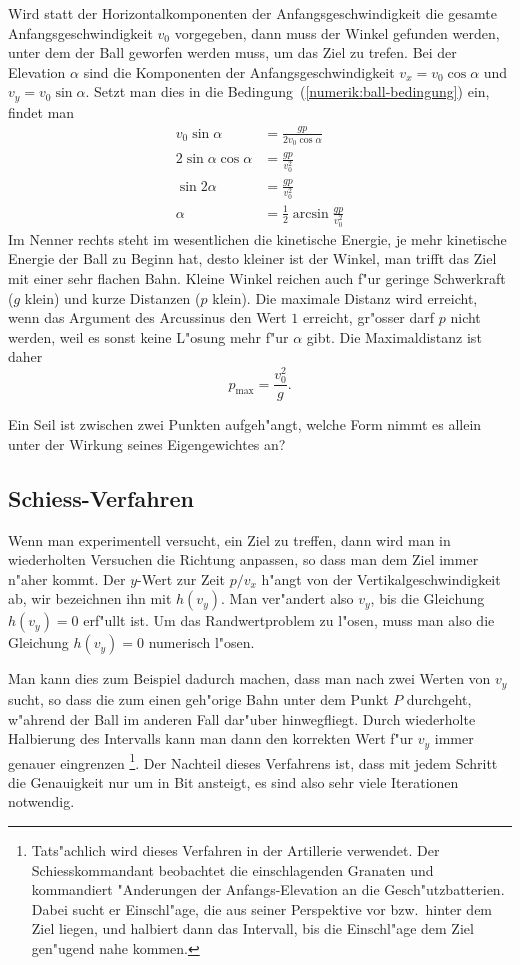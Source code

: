 Wird statt der Horizontalkomponenten der Anfangsgeschwindigkeit die
gesamte Anfangsgeschwindigkeit $v_0$ vorgegeben, dann muss der
Winkel gefunden werden, unter dem der Ball geworfen werden muss,
um das Ziel zu trefen.
Bei der Elevation $\alpha$ sind die Komponenten der Anfangsgeschwindigkeit
$v_x=v_0\cos\alpha$ und $v_y=v_0\sin\alpha$. 
Setzt man dies in die Bedingung~(\ref{numerik:ball-bedingung}) ein,
findet man
\begin{align*}
v_0 \sin \alpha &=\frac{gp}{2v_0\cos\alpha}
\\
2\sin\alpha\cos\alpha&=\frac{gp}{v_0^2}
\\
\sin2\alpha&=\frac{gp}{v_0^2}
\\
\alpha&= \frac12 \arcsin\frac{gp}{v_0^2}
\end{align*}
Im Nenner rechts steht im wesentlichen die kinetische Energie,
je mehr kinetische Energie der Ball zu Beginn hat, desto kleiner
ist der Winkel, man trifft das Ziel mit einer sehr flachen Bahn.
Kleine Winkel reichen auch f"ur geringe Schwerkraft ($g$ klein)
und kurze Distanzen ($p$ klein).
Die maximale Distanz wird erreicht, wenn das Argument des Arcussinus
den Wert $1$ erreicht, gr"osser darf $p$ nicht werden, weil es sonst
keine L"osung mehr f"ur $\alpha$ gibt.
Die Maximaldistanz ist daher
\[
p_{\text{max}} = \frac{v_0^2}{g}.
\]

\begin{aufgabe}
\label{numerik:aufgabe-seil}
Ein Seil ist zwischen zwei Punkten aufgeh"angt, welche Form nimmt es
allein unter der Wirkung seines Eigengewichtes an?
\end{aufgabe}

\subsection{Schiess-Verfahren\label{numerik:schiess-verfahren}}
Wenn man experimentell versucht, ein Ziel zu treffen, dann wird man
in wiederholten Versuchen die Richtung anpassen, so dass man dem Ziel
immer n"aher kommt.
Der $y$-Wert zur Zeit $p/v_x$ h"angt von der Vertikalgeschwindigkeit ab,
wir bezeichnen ihn mit $h(v_y)$.
Man ver"andert also $v_y$, bis die Gleichung $h(v_y)=0$ erf"ullt ist.
Um das Randwertproblem zu l"osen, muss man also die Gleichung $h(v_y)=0$
numerisch l"osen.

Man kann dies zum Beispiel dadurch machen, dass man nach zwei Werten von $v_y$
sucht, so dass die zum einen geh"orige Bahn unter dem Punkt $P$ durchgeht,
w"ahrend der Ball im anderen Fall dar"uber hinwegfliegt.
Durch wiederholte Halbierung des Intervalls kann man dann den korrekten
Wert f"ur $v_y$ immer genauer eingrenzen%
\footnote{%
Tats"achlich wird dieses Verfahren in der Artillerie verwendet.
Der Schiesskommandant beobachtet die einschlagenden Granaten und kommandiert
"Anderungen der Anfangs-Elevation an die Gesch"utzbatterien.
Dabei sucht er Einschl"age, die aus seiner Perspektive vor bzw.~hinter
dem Ziel liegen, und halbiert dann das Intervall, bis die Einschl"age dem
Ziel gen"ugend nahe kommen.}.
Der Nachteil dieses Verfahrens ist, dass mit jedem Schritt die Genauigkeit
nur um in Bit ansteigt, es sind also sehr viele Iterationen notwendig.

